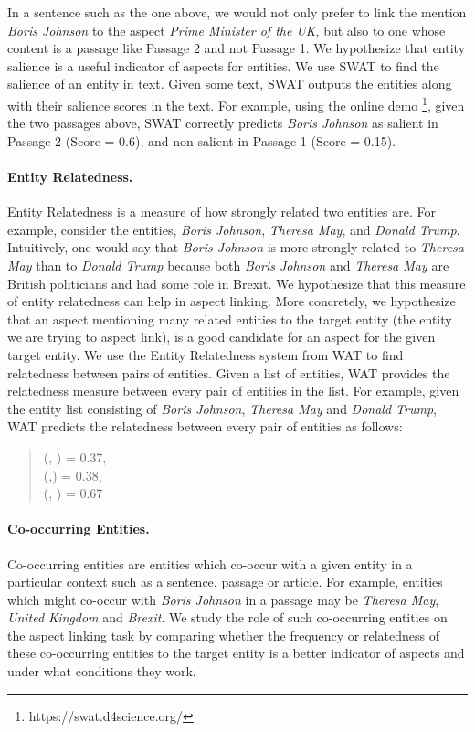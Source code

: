 \documentclass[sigconf,authordraft]{acmart}
\begin{document}
In a sentence such as the one above, we would not only prefer to link the mention \textit{Boris Johnson} to the aspect \textit{Prime Minister of the UK}, but also to one whose content is a passage like Passage 2 and not Passage 1. We hypothesize that entity salience is a useful indicator of aspects for entities. We use SWAT \cite{swat}  to find the salience of an entity in text. Given some text, SWAT outputs the entities along with their salience scores in the text. For example, using the online demo \footnote{https://swat.d4science.org/}, given the two passages above, SWAT correctly predicts \textit{Boris Johnson} as salient in Passage 2 (Score = 0.6), and non-salient in Passage 1 (Score = 0.15). 

\paragraph{\textbf{Entity Relatedness. }}
Entity Relatedness is a measure of how strongly related two entities are. For example, consider the entities, \textit{Boris Johnson}, \textit{Theresa May}, and \textit{Donald Trump}. Intuitively, one would say that \textit{Boris Johnson} is more strongly related to \textit{Theresa May} than to \textit{Donald Trump} because both \textit{Boris Johnson} and \textit{Theresa May} are British politicians and had some role in Brexit. We hypothesize that this measure of entity relatedness can help in aspect linking. More concretely, we hypothesize that an aspect mentioning many related entities to the target entity (the entity we are trying to aspect link), is a good candidate for an aspect for the given target entity. 
We use the Entity Relatedness system from WAT \cite{piccinno2014wat} to find relatedness between pairs of entities. Given a list of entities, WAT provides the relatedness measure between every pair of entities in the list. For example, given the entity list consisting of \textit{Boris Johnson}, \textit{Theresa May} and \textit{Donald Trump}, WAT predicts the relatedness between every pair of entities as follows:
\begin{quote}
    (, ) = 0.37, \\
    (,)    = 0.38, \\
    (, )  = 0.67
\end{quote}

\paragraph{\textbf{Co-occurring Entities.}}
Co-occurring entities are entities which co-occur with a given entity in a particular context such as a sentence, passage or article. For example, entities which might co-occur with \textit{Boris Johnson} in a passage may be \textit{Theresa May}, \textit{United Kingdom} and \textit{Brexit}. We study the role of such co-occurring entities on the aspect linking task by comparing whether the frequency or relatedness of these co-occurring entities to the target entity is a better indicator of aspects and under what conditions they work. 
\end{document}
